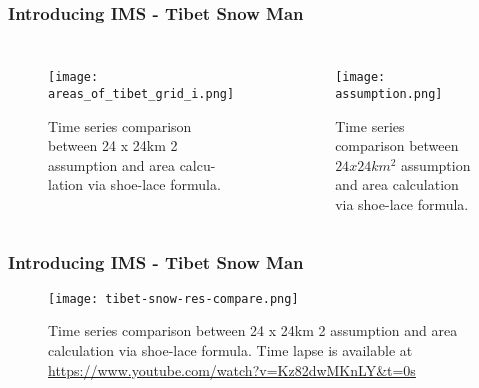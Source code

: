 \begin{frame}
\frametitle{Introducing IMS - Tibet Snow Man}
\begin{columns}
\begin{figure}
\vspace*{-1.25cm}
    \centering
    \begin{minipage}{.85\columnwidth}
    \texttt{[image: areas\_of\_tibet\_grid\_i.png]}
    \caption{\tiny{Time series comparison between 24 x 24km 2 assumption and area calcu-
lation via shoe-lace formula.}}
    \end{minipage}
\end{figure}

\begin{figure}
    \centering
    \begin{minipage}{.95\columnwidth}
    \texttt{[image: assumption.png]}
    \caption{\tiny{Time series comparison between $24 x 24km^2$ assumption and area
calculation via shoe-lace formula.}}
    \end{minipage}
\end{figure}
\end{columns}
\end{frame}

\begin{frame}
\frametitle{Introducing IMS - Tibet Snow Man}
\begin{figure}
    \centering
    \begin{minipage}{.9\columnwidth}
    \texttt{[image: tibet-snow-res-compare.png]}
    \caption{\tiny{Time series comparison between 24 x 24km 2 assumption and area calculation via shoe-lace formula. Time lapse is available at \url{https://www.youtube.com/watch?v=Kz82dwMKnLY&t=0s}}}
    \end{minipage}
\end{figure}
\end{frame}


